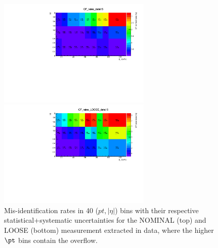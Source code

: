 \begin{figure}[!htb]
\centering
\includegraphics[width=0.65\textwidth]{FIGURES/BKG/chargeFlip/2D_histo_CF_rates_data15.pdf}

\includegraphics[width=0.65\textwidth]{FIGURES/BKG/chargeFlip/2D_histo_CF_rates_LOOSE_data15.pdf}
\caption{\label{fig:CFdata} Mis-identification rates in 40 ($pt , |\eta| $) bins with their respective statistical+systematic uncertainties for the NOMINAL (top) and LOOSE (bottom) measurement extracted in data, where the higher $\pt$ bins contain the overflow.}
\end{figure}


